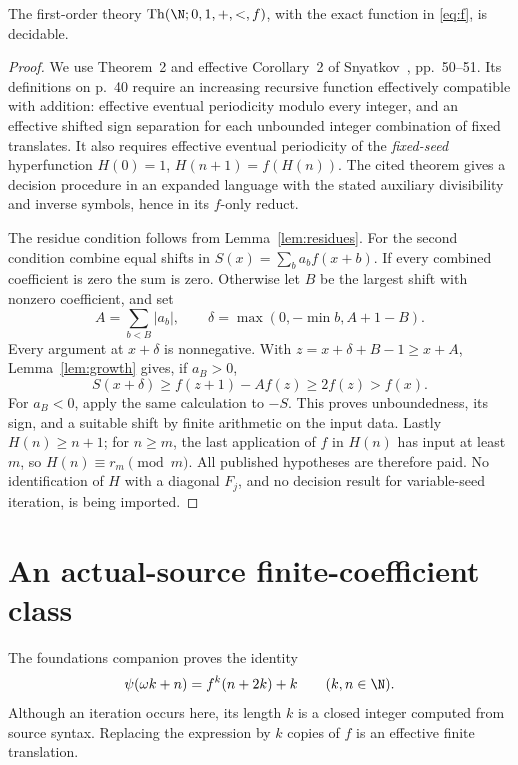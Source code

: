 \documentclass[11pt]{article}
\begin{document}
\begin{theorem}\label{thm:snyatkov}
The first-order theory $\operatorname{Th}(\N;0,1,+,<,f)$, with the exact
function in \eqref{eq:f}, is decidable.
\end{theorem}
\begin{proof}
We use Theorem~2 and effective Corollary~2 of Snyatkov~\cite{snyatkov},
pp.~50--51. Its definitions on p.~40 require an increasing recursive
function effectively compatible with addition: effective eventual periodicity
modulo every integer, and an effective shifted sign separation for each
unbounded integer combination of fixed translates. It also requires effective
eventual periodicity of the \emph{fixed-seed} hyperfunction
$H(0)=1$, $H(n+1)=f(H(n))$. The cited theorem gives a decision procedure in
an expanded language with the stated auxiliary divisibility and inverse
symbols, hence in its $f$-only reduct.

The residue condition follows from Lemma~\ref{lem:residues}. For the second
condition combine equal shifts in $S(x)=\sum_b a_b f(x+b)$. If every
combined coefficient is zero the sum is zero. Otherwise let $B$ be the
largest shift with nonzero coefficient, and set
\[
 A=\sum_{b<B}|a_b|,\qquad
 \delta=\max(0,-\min b,A+1-B).
\]
Every argument at $x+\delta$ is nonnegative. With
$z=x+\delta+B-1\ge x+A$, Lemma~\ref{lem:growth} gives, if $a_B>0$,
\[
 S(x+\delta)\ge f(z+1)-Af(z)\ge2f(z)>f(x).
\]
For $a_B<0$, apply the same calculation to $-S$. This proves unboundedness,
its sign, and a suitable shift by finite arithmetic on the input data.
Lastly $H(n)\ge n+1$; for $n\ge m$, the last application of $f$ in
$H(n)$ has input at least $m$, so $H(n)\equiv r_m\pmod m$.
All published hypotheses are therefore paid. No identification of $H$ with
a diagonal $F_j$, and no decision result for variable-seed iteration, is
being imported.
\end{proof}

\section{An actual-source finite-coefficient class}
The foundations companion proves the identity
\begin{equation}\label{eq:finite-head}
 \psi(\omega k+n)=f^k(n+2k)+k\qquad(k,n\in\N).
\end{equation}
Although an iteration occurs here, its length $k$ is a closed integer
computed from source syntax. Replacing the expression by $k$ copies of $f$
is an effective finite translation.
\end{document}
